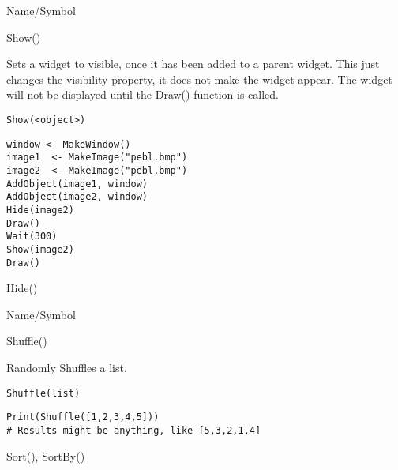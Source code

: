 \rl


\begin{desc}{Name/Symbol}
\item[Name/Symbol]  	Show()

\item[Description] 	Sets a widget to visible, once it has been added to a parent 
			widget.  This just changes the visibility property, it does 
			not make the widget appear.  The widget will not be displayed 
			until the Draw() function is called.

\item[Usage]
\begin{verbatim}
Show(<object>)
\end{verbatim}

\item[Example]
\begin{verbatim}
window <- MakeWindow()
image1  <- MakeImage("pebl.bmp")
image2  <- MakeImage("pebl.bmp")
AddObject(image1, window)
AddObject(image2, window)
Hide(image2)
Draw()
Wait(300)
Show(image2)
Draw()
\end{verbatim}

\item[See Also]     	Hide()
\end{desc}

\rl




\begin{desc}{Name/Symbol}
\item[Name/Symbol] 	Shuffle()

\item[Description] 	Randomly Shuffles a list.

\item[Usage]    
\begin{verbatim}
Shuffle(list)
\end{verbatim}

\item[Example]
\begin{verbatim}
Print(Shuffle([1,2,3,4,5]))
# Results might be anything, like [5,3,2,1,4]
\end{verbatim}

\item[See Also]    	Sort(), SortBy()
\end{desc}

\rl


